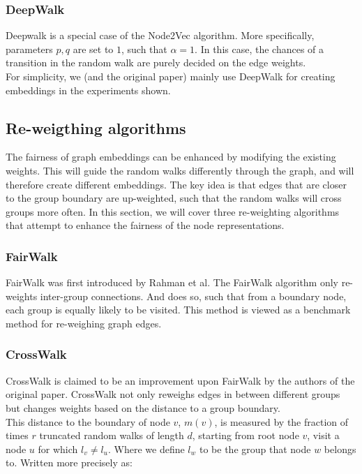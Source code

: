 \subsubsection{DeepWalk}
Deepwalk is a special case of the Node2Vec algorithm. More specifically, parameters $p, q$ are set to $1$, such that $\alpha = 1$. In this case, the chances of a transition in the random walk are purely decided on the edge weights. \\
For simplicity, we (and the original paper) mainly use DeepWalk for creating embeddings in the experiments shown.

\subsection{Re-weigthing algorithms}
The fairness of graph embeddings can be enhanced by modifying the existing weights. This will guide the random walks differently through the graph, and will therefore create different embeddings. The key idea is that edges that are closer to the group boundary are up-weighted, such that the random walks will cross groups more often. In this section, we will cover three re-weighting algorithms that attempt to enhance the fairness of the node representations.

\subsubsection{FairWalk}
FairWalk \cite{ijcai2019p456} was first introduced by Rahman et al. The FairWalk algorithm only re-weights inter-group connections. And does so, such that from a boundary node, each group is equally likely to be visited. This method is viewed as a benchmark method for re-weighing graph edges.

\subsubsection{CrossWalk}
CrossWalk \cite{khajehnejad2022crosswalk} is claimed to be an improvement upon FairWalk by the authors of the original paper.
CrossWalk not only reweighs edges in between different groups but changes weights based on the distance to a group boundary. \\
This distance to the boundary of node $v$, $m(v)$, is measured by the fraction of times $r$ truncated random walks of length $d$, starting from root node $v$, visit a node $u$ for which $l_v \neq l_u$. Where we define $l_w$ to be the group that node $w$ belongs to. Written more precisely as:

